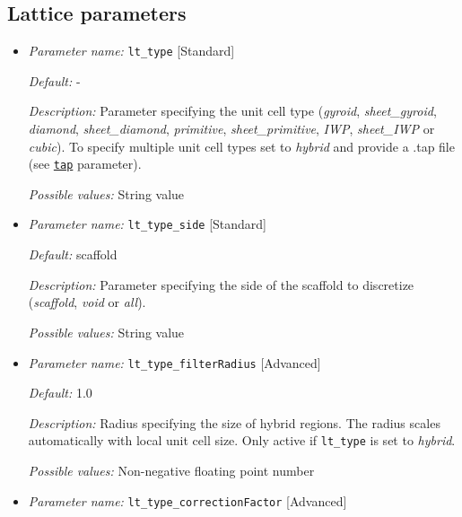 \subsection{Lattice parameters} \label{parameters:lattice}
\begin{itemize}[itemsep=0.8em, parsep=0.3em]
	\item {\it Parameter name:} {\tt lt\_type} \hfill [Standard]
	\label{parameters:lt_type}

	
	{\it Default:} -
	
	{\it Description:} Parameter specifying the unit cell type ({\it gyroid}, {\it sheet\_gyroid}, {\it diamond}, {\it sheet\_diamond}, {\it primitive}, {\it sheet\_primitive}, {\it IWP}, {\it sheet\_IWP} or {\it cubic}). To specify multiple unit cell types set to {\it hybrid} and provide a .tap file (see \hyperref[parameters:tap]{\tt tap} parameter).
	
	{\it Possible values:} String value

	\item {\it Parameter name:} {\tt lt\_type\_side} \hfill [Standard]
	\label{parameters:me_type_side}
	
	
	{\it Default:} scaffold
	
	{\it Description:} Parameter specifying the side of the scaffold to discretize ({\it scaffold}, {\it void} or {\it all}).
	
	{\it Possible values:} String value

	\item {\it Parameter name:} {\tt lt\_type\_filterRadius} \hfill [Advanced]
	\label{parameters:lt_type_filterRadius}
	
	
	{\it Default:} 1.0
	
	{\it Description:} Radius specifying the size of hybrid regions. The radius scales automatically with local unit cell size. Only active if {\tt lt\_type} is set to {\it hybrid}.
	
	{\it Possible values:} Non-negative floating point number
	
	\item {\it Parameter name:} {\tt lt\_type\_correctionFactor} \hfill [Advanced]
	\label{parameters:lt_type_correctionFactor}
	

\end{itemize}
